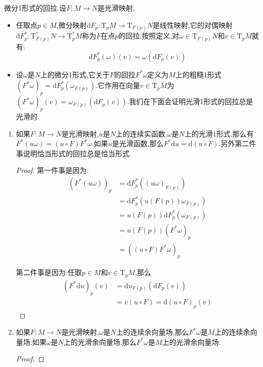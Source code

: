 微分1形式的回拉.设$F:M\to N$是光滑映射,
\begin{itemize}
	\item 任取点$p\in M$,微分映射$\mathrm{d}F_p:\mathrm{T}_pM\to\mathrm{T}_{F(p)}N$是线性映射,它的对偶映射$\mathrm{d}F^*_p:\mathrm{T}^*_{F(p)}N\to\mathrm{T}^*_pM$称为$F$在点$p$的回拉.按照定义,对$\omega\in\mathrm{T}_{F(p)}N$和$v\in\mathrm{T}_pM$就有:
	$$\mathrm{d}F^*_p(\omega)(v)=\omega(\mathrm{d}F_p(v))$$
	\item 设$\omega$是$N$上的微分1形式,它关于$F$的回拉$F^*\omega$定义为$M$上的粗糙1形式$(F^*\omega)_p=\mathrm{d}F_p^*(\omega_{F(p)})$.它作用在向量$v\in\mathrm{T}_pM$为$(F^*\omega)_p(v)=\omega_{F(p)}(\mathrm{d}F_p(v))$.我们在下面会证明光滑1形式的回拉总是光滑的.
\end{itemize}
\begin{enumerate}
	\item 如果$F:M\to N$是光滑映射,$u$是$N$上的连续实函数,$\omega$是$N$上的光滑1形式,那么有$F^*(u\omega)=(u\circ F)F^*\omega$.如果$u$是光滑函数,那么$F^*\mathrm{d}u=\mathrm{d}(u\circ F)$.另外第二件事说明恰当形式的回拉总是恰当形式.
	\begin{proof}
		
		第一件事是因为:
		\begin{align*}
		(F^*(u\omega))_p&=\mathrm{d}F_p^*\left((u\omega)_{F(p)}\right)\\&=\mathrm{d}F_p^*\left(u(F(p))\omega_{F(p)}\right)\\&=u(F(p))\mathrm{d}F_p^*(\omega_{F(p)})\\&=u(F(p))(F^*\omega)_p\\&=\left((u\circ F)F^*\omega\right)_p
		\end{align*}
		
		第二件事是因为:任取$p\in M$和$v\in\mathrm{T}_pM$,那么
		\begin{align*}
		(F^*\mathrm{d}u)_p(v)&=\mathrm{d}u_{F(p)}\left(\mathrm{d}F_p(v)\right)\\&=v(u\circ F)=\mathrm{d}(u\circ F)_p(v)
		\end{align*}
	\end{proof}
    \item 如果$F:M\to N$是光滑映射,$\omega$是$N$上的连续余向量场,那么$F^*\omega$是$M$上的连续余向量场;如果$\omega$是$N$上的光滑余向量场,那么$F^*\omega$是$M$上的光滑余向量场.
    \begin{proof}
    	

\end{proof}
\end{enumerate}
